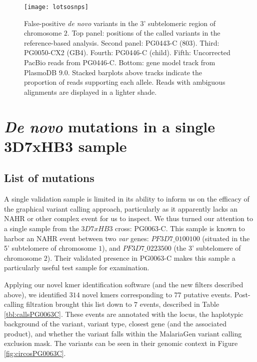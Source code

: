 \begin{sidewaysfigure}[h!]
  \centering
    \texttt{[image: lotsosnps]}
  \caption{False-positive \textit{de novo} variants in the 3' subtelomeric region of chromosome $2$.  Top panel: positions of the called variants in the reference-based analysis.  Second panel: PG0443-C (803).  Third: PG0050-CX2 (GB4).  Fourth: PG0446-C (child).  Fifth: Uncorrected PacBio reads from PG0446-C.  Bottom: gene model track from PlasmoDB $9.0$.  Stacked barplots above tracks indicate the proportion of reads supporting each allele.  Reads with ambiguous alignments are displayed in a lighter shade.}
  \label{fig:lotsosnps}
\end{sidewaysfigure}

\section{\textit{De novo} mutations in a single 3D7xHB3 sample}

\subsection{List of mutations}

A single validation sample is limited in its ability to inform us on the efficacy of the graphical variant calling approach, particularly as it apparently lacks an NAHR or other complex event for us to inspect.  We thus turned our attention to a single sample from the $3D7xHB3$ cross: PG0063-C.  This sample is known to harbor an NAHR event between two \textit{var} genes: $PF3D7\_0100100$ (situated in the 5' subtelomere of chromosome $1$), and $PF3D7\_0223500$ (the 3' subtelomere of chromosome $2$).  Their validated presence in PG0063-C makes this sample a particularly useful test sample for examination.

Applying our novel kmer identification software (and the new filters described above), we identified $314$ novel kmers corresponding to $77$ putative events.  Post-calling filtration brought this list down to $7$ events, described in Table \ref{tbl:callsPG0063C}.  These events are annotated with the locus, the haplotypic background of the variant, variant type, closest gene (and the associated product), and whether the variant falls within the MalariaGen variant calling exclusion mask.  The variants can be seen in their genomic context in Figure \ref{fig:circosPG0063C}.  

